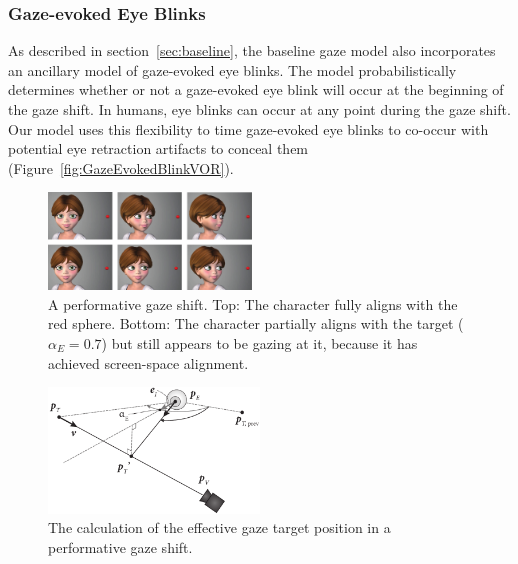 \subsubsection{Gaze-evoked Eye Blinks}

As described in section~\ref{sec:baseline}, the baseline gaze model also incorporates an ancillary model of gaze-evoked eye blinks. The model probabilistically determines whether or not a gaze-evoked eye blink will occur at the beginning of the gaze shift.
In humans, eye blinks can occur at any point during the gaze shift. Our model uses this flexibility to time gaze-evoked eye blinks to co-occur with potential eye retraction artifacts to conceal them (Figure~\ref{fig:GazeEvokedBlinkVOR}).

\begin{figure}[!b]
\centering
\vspace{-6pt}
\includegraphics[width=0.48\textwidth]{Figures/PerformativeGazeExample-small.pdf}
\caption{A performative gaze shift. Top: The character fully aligns with the red sphere. Bottom: The character partially aligns with the target ($\alpha_E = 0.7$) but still appears to be gazing at it, because it has achieved screen-space alignment.}
\vspace{-6pt}
\label{fig:PerformativeGazeExample}
\end{figure}

\begin{figure}[t]
\centering
\vspace{2pt}
\includegraphics[width=0.5\textwidth]{Figures/EyeAlignment.pdf}
\caption{The calculation of the effective gaze target position in a performative gaze shift.}
\vspace{-10pt}
\label{fig:EyeAlignment}
\end{figure}

